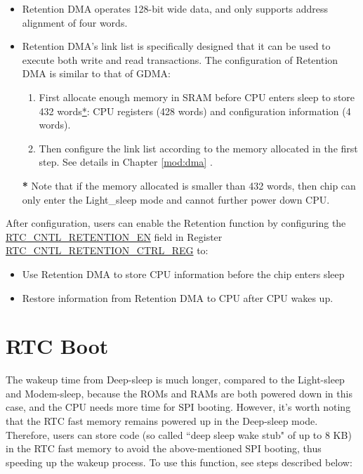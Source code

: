 \documentclass[main\_\_EN.tex]{subfiles}
\begin{document}
\begin{itemize}
    \item Retention DMA operates 128-bit wide data, and only supports address alignment of four words.
    \item Retention DMA's link list is specifically designed that it can be used to execute both write and read transactions. The configuration of Retention DMA is similar to that of GDMA: 
    \begin{enumerate}
        \item First allocate enough memory in SRAM before CPU enters sleep to store 432 words\hyperlink{dma-note1}{*}: CPU registers (428 words) and configuration information (4 words).
        \item Then configure the link list according to the memory allocated in the first step. See details in Chapter \ref{mod:dma} \textit{}.
    \end{enumerate}


\begin{tiplisting}\label{dma-note1}
\textbf{*} Note that if the memory allocated is smaller than 432 words, then chip can only enter the Light\_sleep mode and cannot further power down CPU.
\end{tiplisting}
\end{itemize}

After configuration, users can enable the Retention function by configuring the  \hyperref[fielddesc:RTCCNTLRETENTIONEN]{RTC\_CNTL\_RETENTION\_EN} field in Register \hyperref[regdesc:RTCCNTLRETENTIONCTRLREG]{RTC\_CNTL\_RETENTION\_CTRL\_REG} to:
\begin{itemize}
    \item Use Retention DMA to store CPU information before the chip enters sleep
    \item Restore information from Retention DMA to CPU after CPU wakes up.
\end{itemize}

\section{RTC Boot}
The wakeup time from Deep-sleep is much longer, compared to the Light-sleep and Modem-sleep, because the ROMs and RAMs are both powered down in this case, and the CPU needs more time for SPI booting. However, it's worth noting that the RTC fast memory remains powered up in the Deep-sleep mode. Therefore, users can store code (so called ``deep sleep wake stub" of up to 8 KB) in the RTC fast memory to avoid the above-mentioned SPI booting, thus speeding up the wakeup process. To use this function, see steps described below:
\end{document}
